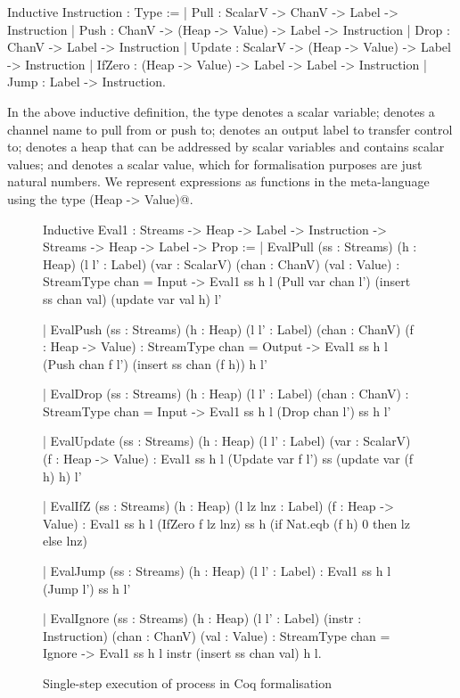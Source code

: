 \pagebreak
\begin{coq}
Inductive Instruction : Type :=
  | Pull    : ScalarV -> ChanV           -> Label -> Instruction
  | Push    : ChanV   -> (Heap -> Value) -> Label -> Instruction
  | Drop    : ChanV                      -> Label -> Instruction
  | Update  : ScalarV -> (Heap -> Value) -> Label -> Instruction
  | IfZero  : (Heap -> Value)   -> Label -> Label -> Instruction
  | Jump    :                               Label -> Instruction.
\end{coq}

In the above inductive definition, the type \Hs@ScalarV@ denotes a scalar variable; \Hs@ChanV@ denotes a channel name to pull from or push to; \Hs@Label@ denotes an output label to transfer control to; \Hs@Heap@ denotes a heap that can be addressed by scalar variables and contains scalar values; and \Hs@Value@ denotes a scalar value, which for formalisation purposes are just natural numbers.
We represent expressions as functions in the meta-language using the type \Hs@(Heap -> Value)@.

\begin{figure}
\begin{coq}
Inductive Eval1 : Streams -> Heap -> Label -> Instruction
               -> Streams -> Heap -> Label -> Prop :=
  | EvalPull (ss : Streams) (h : Heap) (l l' : Label)
             (var : ScalarV) (chan : ChanV) (val : Value)
     : StreamType chan = Input
    -> Eval1        ss                           h  l (Pull var chan l')
            (insert ss chan val) (update var val h) l'

  | EvalPush (ss : Streams) (h : Heap) (l l' : Label) (chan : ChanV) (f : Heap -> Value)
     : StreamType chan = Output
    -> Eval1         ss             h l (Push chan f l')
             (insert ss chan (f h)) h l'

  | EvalDrop (ss : Streams) (h : Heap) (l l' : Label) (chan : ChanV)
     : StreamType chan = Input
    -> Eval1 ss h l (Drop chan l')
             ss h l'

  | EvalUpdate (ss : Streams) (h : Heap) (l l' : Label)
               (var : ScalarV) (f : Heap -> Value)
     : Eval1 ss                   h  l (Update var f l')
             ss (update var (f h) h) l'

  | EvalIfZ (ss : Streams) (h : Heap) (l lz lnz : Label) (f : Heap -> Value)
     : Eval1 ss h l (IfZero f lz lnz)
             ss h (if Nat.eqb (f h) 0 then lz else lnz)

  | EvalJump (ss : Streams) (h : Heap) (l l' : Label)
     : Eval1 ss h l (Jump l')
             ss h l'

  | EvalIgnore (ss : Streams) (h : Heap) (l l' : Label) (instr : Instruction)
              (chan : ChanV) (val : Value)
     : StreamType chan = Ignore
    -> Eval1         ss           h l instr
             (insert ss chan val) h l.
\end{coq}
\caption{Single-step execution of process in Coq formalisation}
\label{figs/coq/single-step}
\end{figure}


